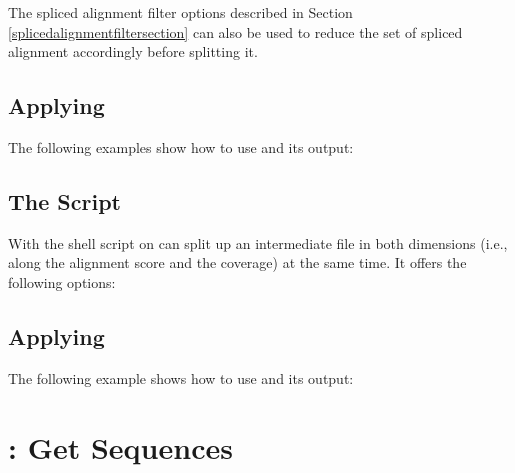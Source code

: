 \documentclass[11pt,a4paper,titlepage]{article}
\begin{document}
The spliced alignment filter options described in Section \ref{splicedalignmentfiltersection} can also be used to reduce the set of spliced alignment accordingly before splitting it.


\subsection{Applying \Callgthsplit}

The following examples show how to use \Callgthsplit and its output:

\begin{footnotesize}\end{footnotesize}



\subsection{The Script \Callgthsplittwodim}
With the shell script \Callgthsplittwodim on can split up an intermediate file in both dimensions (i.e., along the alignment score and the coverage) at the same time. It offers the following options:

\begin{Justshowoptions}
\end{Justshowoptions}


\subsection{Applying \Callgthsplittwodim}

The following example shows how to use \Callgthsplittwodim and its output:

\begin{footnotesize}\end{footnotesize}





\section{\Callgthgetseq: Get \Fasta Sequences} 
\label{gthextractfastasection}
\end{document}
